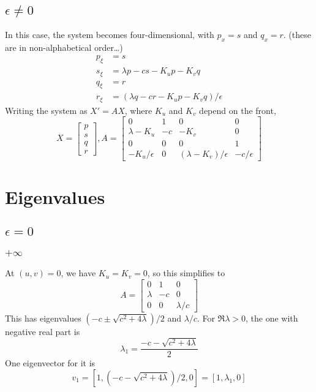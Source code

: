\documentclass[10pt]{article}
\begin{document}
\subsection{$\epsilon \neq 0$}
In this case, the system becomes four-dimensional, with $p_x = s$ and $q_x = r$.
(these are in non-alphabetical order\ldots)
\begin{align}
p_\xi &= s \\
s_\xi &= \lambda p - c s - K_u p - K_v q \\
q_\xi &= r \\
r_\xi &= (\lambda q - c r - K_u p - K_v q)/\epsilon
\end{align}
Writing the system as $X' = AX$, where $K_u$ and $K_v$ depend on the front,
\[
X = \begin{bmatrix}p\\s\\q\\r\end{bmatrix},
A = \begin{bmatrix}
0 & 1 & 0 & 0 \\
\lambda - K_u  &  -c  &  -K_v  & 0 \\
0 & 0 & 0 & 1 \\
- K_u/\epsilon &  0  &  (\lambda - K_v)/\epsilon  &  - c / \epsilon
\end{bmatrix}
\]



\section{Eigenvalues}
\subsection{$\epsilon = 0$}
\subsubsection{$+\infty$}
At $(u,v) = 0$, we have $K_u = K_v = 0$, so this simplifies to
\[
A = \begin{bmatrix}
0 & 1 & 0 \\
\lambda &  -c  &  0 \\
0 &  0  &  \lambda/c
\end{bmatrix}
\]
This has eigenvalues $(-c \pm \sqrt{c^2 + 4 \lambda})/2$ and $\lambda/c$.  For $\Re \lambda > 0$, the one with negative real part is
\[\lambda_1 = \frac{-c - \sqrt{c^2 + 4 \lambda}}{2}\]
One eigenvector for it is
\[v_1 = [1,(-c - \sqrt{c^2 + 4 \lambda})/2,0] = [1,\lambda_1,0] \]
\end{document}
